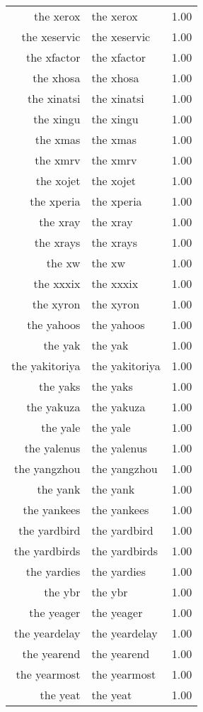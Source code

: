 \begin{table}[ht]
\begin{tabular}{rlr}
  the xerox & the xerox & 1.00 \\ 
  the xeservic & the xeservic & 1.00 \\ 
  the xfactor & the xfactor & 1.00 \\ 
  the xhosa & the xhosa & 1.00 \\ 
  the xinatsi & the xinatsi & 1.00 \\ 
  the xingu & the xingu & 1.00 \\ 
  the xmas & the xmas & 1.00 \\ 
  the xmrv & the xmrv & 1.00 \\ 
  the xojet & the xojet & 1.00 \\ 
  the xperia & the xperia & 1.00 \\ 
  the xray & the xray & 1.00 \\ 
  the xrays & the xrays & 1.00 \\ 
  the xw & the xw & 1.00 \\ 
  the xxxix & the xxxix & 1.00 \\ 
  the xyron & the xyron & 1.00 \\ 
  the yahoos & the yahoos & 1.00 \\ 
  the yak & the yak & 1.00 \\ 
  the yakitoriya & the yakitoriya & 1.00 \\ 
  the yaks & the yaks & 1.00 \\ 
  the yakuza & the yakuza & 1.00 \\ 
  the yale & the yale & 1.00 \\ 
  the yalenus & the yalenus & 1.00 \\ 
  the yangzhou & the yangzhou & 1.00 \\ 
  the yank & the yank & 1.00 \\ 
  the yankees & the yankees & 1.00 \\ 
  the yardbird & the yardbird & 1.00 \\ 
  the yardbirds & the yardbirds & 1.00 \\ 
  the yardies & the yardies & 1.00 \\ 
  the ybr & the ybr & 1.00 \\ 
  the yeager & the yeager & 1.00 \\ 
  the yeardelay & the yeardelay & 1.00 \\ 
  the yearend & the yearend & 1.00 \\ 
  the yearmost & the yearmost & 1.00 \\ 
  the yeat & the yeat & 1.00 \\ 

\end{tabular}
\end{table}
